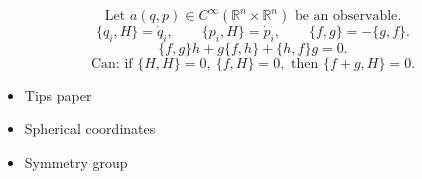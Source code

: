 \documentclass[11pt]{article}
\begin{document}
\[
\text{Let }a(q,p)\in C^\infty(\mathbb R^n\times\mathbb R^n)
\text{ be an observable.}
\]
\[
\{q_i,H\}=\dot q_i,\qquad
\{p_i,H\}=\dot p_i,\qquad
\{f,g\}=-\{g,f\}.
\]
\[
\{f,g\}h+g\{f,h\}+\{h,f\}g=0.
\]
\[
\text{Can: if }\{H,H\}=0,\ \{f,H\}=0,\text{ then }\{f+g,H\}=0.
\]

\begin{itemize}
\item Tips paper
\item Spherical coordinates
\item Symmetry group
\end{itemize}
\end{document}
